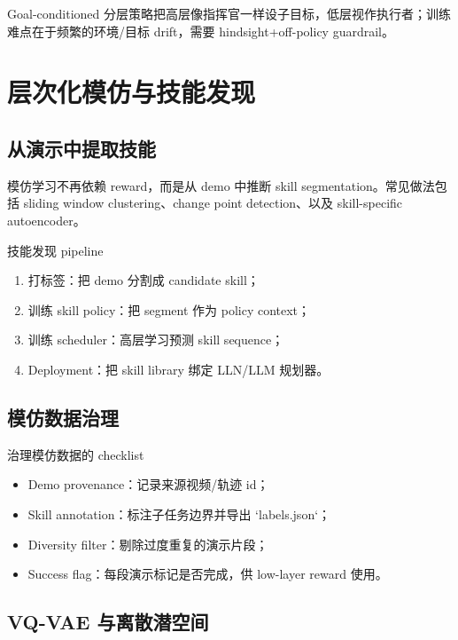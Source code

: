 \documentclass[a4paper]{article}
\begin{document}
Goal-conditioned 分层策略把高层像指挥官一样设子目标，低层视作执行者；训练难点在于频繁的环境/目标 drift，需要 hindsight+off-policy guardrail。

\section{层次化模仿与技能发现}

\subsection{从演示中提取技能}

模仿学习不再依赖 reward，而是从 demo 中推断 skill segmentation。常见做法包括 sliding window clustering、change point detection、以及 skill-specific autoencoder。

\begin{importantbox}{技能发现 pipeline}
\begin{enumerate}
    \item 打标签：把 demo 分割成 candidate skill；
    \item 训练 skill policy：把 segment 作为 policy context；
    \item 训练 scheduler：高层学习预测 skill sequence；
    \item Deployment：把 skill library 绑定 LLN/LLM 规划器。
\end{enumerate}
\end{importantbox}

\subsection{模仿数据治理}

\begin{knowledgebox}{治理模仿数据的 checklist}
\begin{itemize}
    \item Demo provenance：记录来源视频/轨迹 id；
    \item Skill annotation：标注子任务边界并导出 `labels.json`；
    \item Diversity filter：剔除过度重复的演示片段；
    \item Success flag：每段演示标记是否完成，供 low-layer reward 使用。
\end{itemize}
\end{knowledgebox}

\subsection{VQ-VAE 与离散潜空间}
\end{document}
